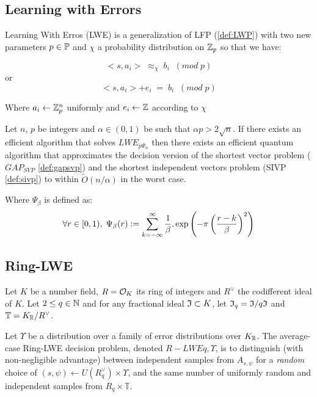 \documentclass[Ingles]{ic-tese-v3}
\begin{document}
\subsection{Learning with Errors}
\label{sec:org21b6ccb}
\begin{definition}
  \label{def:LWE}
  Learning With Erros (LWE) is a generalization of LFP (\ref{def:LWP}) with two new parameters $p \in \P$ and $\chi$ a probability distribution on $\Z_p$ so that we have:

     $$ <s, a_i> \; \approx_\chi \; b_i \;\; (mod\; p) $$
     or
     $$ <s, a_i> + e_i \; = \;  b_i \;\; (mod\; p) $$

     Where $a_i \gets \Z^n_p$ uniformly and $e_i \gets \Z$ according to $\chi$

\end{definition}

\begin{theorem}
  Let $n$, $p$ be integers and $\alpha \in (0, 1)$ be such that $\alpha p > 2\sqrt{n}$. If
  there exists an efficient algorithm that solves $LWE_{p \Psi_\alpha}$ then there
  exists an efficient quantum algorithm that approximates the decision version
  of the shortest vector problem ($GAP_{SVP}$ \ref{def:gapsvp}) and the
  shortest independent vectors problem (SIVP \ref{def:sivp}) to within
  $\tilde{O}(n/\alpha)$ in the worst case.

  Where $\Psi_\beta$ is defined as:
  $$
  \forall r \in [0,1), \; \Psi_\beta(r) \defsym \sum_{k=-\infty}^\infty{\frac{1}{\beta} . \exp{\left( -\pi \left( \frac{r-k}{\beta} \right)^2 \right)}}
  $$
\end{theorem}

\subsection{Ring-LWE}
\label{sec:orgf8b0ff3}
Let \(K\) be a number field, \(R = \Ok\) its ring of integers and \(R^\vee\) the
codifferent ideal of \(K\). Let \(2 \leq q \in \N\) and for any fractional ideal \(\Id \subset
    K\), let \(\Id_q = \Id/q\Id\) and \(\mathbb{T} = K_\R/R^\vee\).  

\begin{definition}
  \label{def:rlwe-decision}
  Let $\Upsilon$ be a distribution over a family of error distributions over $K_\R$.
  The average-case Ring-LWE decision problem, denoted $R-LWE{q,\Upsilon}$, is to
  distinguish (with non-negligible advantage) between independent samples from
  $A_{s, \psi}$ for a \textit{random} choice of $(s,\psi) \longleftarrow U(R_q^\vee) \times \Upsilon$, and the
  same number of uniformly random and independent samples from $R_q \times \mathbb{T}$.
\end{definition}
\end{document}
